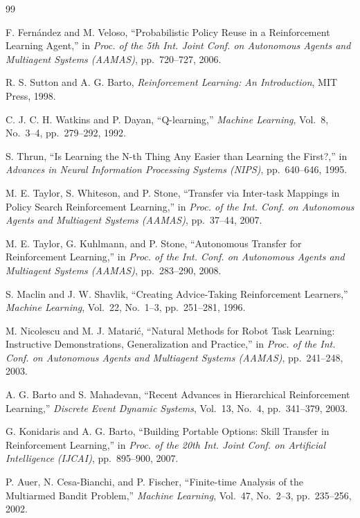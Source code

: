 \documentclass[autodetect-engine,dvipdfmx,platex]{deimj}
\begin{document}
\begin{thebibliography}{99}

F. Fern{\'a}ndez and M. Veloso,
``Probabilistic Policy Reuse in a Reinforcement Learning Agent,''
in \textit{Proc. of the 5th Int. Joint Conf. on Autonomous Agents and Multiagent Systems (AAMAS)},
pp.~720--727, 2006.

R. S. Sutton and A. G. Barto,
\textit{Reinforcement Learning: An Introduction},
MIT Press, 1998.

C. J. C. H. Watkins and P. Dayan,
``Q-learning,''
\textit{Machine Learning},
Vol.~8, No.~3--4, pp.~279--292, 1992.

S. Thrun,
``Is Learning the N-th Thing Any Easier than Learning the First?,''
in \textit{Advances in Neural Information Processing Systems (NIPS)},
pp.~640--646, 1995.

M. E. Taylor, S. Whiteson, and P. Stone,
``Transfer via Inter-task Mappings in Policy Search Reinforcement Learning,''
in \textit{Proc. of the Int. Conf. on Autonomous Agents and Multiagent Systems (AAMAS)},
pp.~37--44, 2007.

M. E. Taylor, G. Kuhlmann, and P. Stone,
``Autonomous Transfer for Reinforcement Learning,''
in \textit{Proc. of the Int. Conf. on Autonomous Agents and Multiagent Systems (AAMAS)},
pp.~283--290, 2008.

S. Maclin and J. W. Shavlik,
``Creating Advice-Taking Reinforcement Learners,''
\textit{Machine Learning},
Vol.~22, No.~1--3, pp.~251--281, 1996.

M. Nicolescu and M. J. Matari{\'c},
``Natural Methods for Robot Task Learning: Instructive Demonstrations, Generalization and Practice,''
in \textit{Proc. of the Int. Conf. on Autonomous Agents and Multiagent Systems (AAMAS)},
pp.~241--248, 2003.

A. G. Barto and S. Mahadevan,
``Recent Advances in Hierarchical Reinforcement Learning,''
\textit{Discrete Event Dynamic Systems},
Vol.~13, No.~4, pp.~341--379, 2003.

G. Konidaris and A. G. Barto,
``Building Portable Options: Skill Transfer in Reinforcement Learning,''
in \textit{Proc. of the 20th Int. Joint Conf. on Artificial Intelligence (IJCAI)},
pp.~895--900, 2007.

P. Auer, N. Cesa-Bianchi, and P. Fischer,
``Finite-time Analysis of the Multiarmed Bandit Problem,''
\textit{Machine Learning},
Vol.~47, No.~2--3, pp.~235--256, 2002.

\end{thebibliography}
\end{document}
